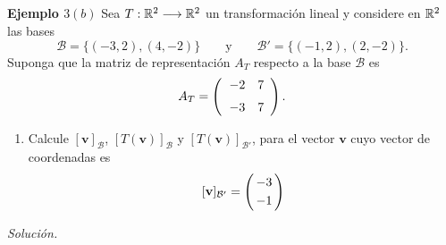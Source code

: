 \subsection{}
%
\begin{frame}%
	
	\begin{ej}{\textbf{Ejemplo $3(b)$ }}
		Sea $T:\mathbb{R}^2\longrightarrow\mathbb{R}^2$ un transformación lineal y considere en $\mathbb{R}^2$ las bases
		\[
		\mathcal{B}=\{(-3,2), (4,-2)\} \qquad \text{y} \qquad \mathcal{B}'=\{(-1,2), (2,-2)\}. 
		\]
		Suponga que la matriz de representación $A_T$ respecto a la base 
		$\mathcal{B}$ es 
		\[
		A_T = 
		\left( 
		\begin{array}{@{\hspace{1\tabcolsep}}rr}	
		-2 & 7 \\[2mm] 
		-3 & 7
		\end{array} 
		\right).
		\]
		
		\vspace{-2mm}
		\begin{enumerate}[$b$]
			\justifying
			\item Calcule $\left[\mathbf{v}\right]_{\mathcal{B}}$, $\left[T(\mathbf{v})\right]_{\mathcal{B}}$ y $\left[T(\mathbf{v})\right]_{\mathcal{B}'}$, para el vector $\mathbf{v}$ cuyo vector de coordenadas es 
			\[
			[\mathbf{v}]_{\mathcal{B}'}=\left(
			\begin{array}{@{\hspace{0.3\tabcolsep}}c@{\hspace{0.3\tabcolsep}}}
			-3  \\[1mm]
			-1  
			\end{array}
			\right)
			\]
		\end{enumerate}
	\end{ej}
	\textit{Solución.}
	
\end{frame}


